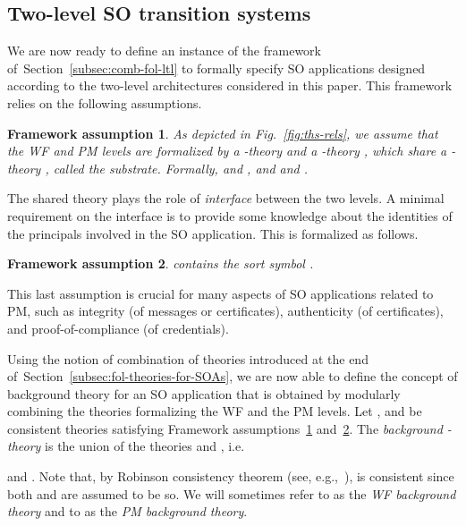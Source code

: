 \documentclass[conference]{IEEEtran}
\newtheorem{framework-assumption}{Framework assumption}
\newcommand{\close}{\IEEEQEDclosed}
\newcommand{\secref}[1]{Section~\ref{#1}}
\begin{document}
\subsection{Two-level SO transition systems}
We are now ready to define an instance of the framework
of~\secref{subsec:comb-fol-ltl} to formally specify SO
applications designed according to the two-level architectures
considered in this paper. This framework relies on the following assumptions.
\begin{framework-assumption}\label{framework-one}
  As depicted in Fig.~\ref{fig:ths-rels}, we assume that the WF and
  PM levels are formalized by a -theory
   and a -theory , which share a
  -theory , called the
  \emph{substrate}. Formally,  and , and  and
  . \hfill \close
\end{framework-assumption}

The shared theory  plays the role of \emph{interface} between the
two levels.  A minimal requirement on the interface is to provide some
knowledge about the identities of the principals involved in the SO
application. This is formalized as follows.
\begin{framework-assumption}\label{framework-two}
   contains the sort symbol . \hfill \close
\end{framework-assumption}

This last assumption is crucial for many aspects of SO applications
related to PM, such as integrity (of messages or certificates),
authenticity (of certificates), and proof-of-compliance (of
credentials).

Using the notion of combination of theories introduced at the end
of~\secref{subsec:fol-theories-for-SOAs}, we are now able to define
the concept of background theory for an SO application that is obtained by
modularly combining the theories formalizing the WF and the PM levels.
Let , and  be consistent
theories satisfying Framework assumptions~\ref{framework-one}
and~\ref{framework-two}.  The \emph{background
  -theory } is the union of the
theories  and , i.e.\

and .  Note that, by
Robinson consistency theorem (see, e.g.,~\cite{chang-kiesler}),
 is consistent since both  and
 are assumed to be so.  We will sometimes refer to
 as the \emph{WF background theory} and to
 as the \emph{PM background theory}.
\end{document}
